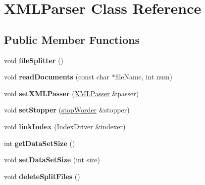 \hypertarget{class_x_m_l_parser}{\section{X\+M\+L\+Parser Class Reference}
\label{class_x_m_l_parser}
}
\subsection*{Public Member Functions}
\begin{DoxyCompactItemize}
\item 
\hypertarget{class_x_m_l_parser_a1e03b4c51d5514a5d380a29ce2b9ae02}{void {\bfseries file\+Splitter} ()}\label{class_x_m_l_parser_a1e03b4c51d5514a5d380a29ce2b9ae02}

\item 
\hypertarget{class_x_m_l_parser_ab523af367d976733643a693fa076e9f3}{void {\bfseries read\+Documents} (const char $\ast$file\+Name, int num)}\label{class_x_m_l_parser_ab523af367d976733643a693fa076e9f3}

\item 
\hypertarget{class_x_m_l_parser_a517be279016d30f9d0cdea2dcf4ccc10}{void {\bfseries set\+X\+M\+L\+Passer} (\hyperlink{class_x_m_l_passer}{X\+M\+L\+Passer} \&passer)}\label{class_x_m_l_parser_a517be279016d30f9d0cdea2dcf4ccc10}

\item 
\hypertarget{class_x_m_l_parser_ad05bc71918b6b83f11f7d273e3cbf8cc}{void {\bfseries set\+Stopper} (\hyperlink{classstop_worder}{stop\+Worder} \&stopper)}\label{class_x_m_l_parser_ad05bc71918b6b83f11f7d273e3cbf8cc}

\item 
\hypertarget{class_x_m_l_parser_a3aab029f49fac03c2a9ac8245301d3b5}{void {\bfseries link\+Index} (\hyperlink{class_index_driver}{Index\+Driver} \&indexer)}\label{class_x_m_l_parser_a3aab029f49fac03c2a9ac8245301d3b5}

\item 
\hypertarget{class_x_m_l_parser_aa0b86f09d7bdd7d336238f7fff9e2eec}{int {\bfseries get\+Data\+Set\+Size} ()}\label{class_x_m_l_parser_aa0b86f09d7bdd7d336238f7fff9e2eec}

\item 
\hypertarget{class_x_m_l_parser_ad0c0309ae4b155690bdf6224d3406510}{void {\bfseries set\+Data\+Set\+Size} (int size)}\label{class_x_m_l_parser_ad0c0309ae4b155690bdf6224d3406510}

\item 
\hypertarget{class_x_m_l_parser_a141c50da7263bcc3460ef970fd86dd7e}{void {\bfseries delete\+Split\+Files} ()}\label{class_x_m_l_parser_a141c50da7263bcc3460ef970fd86dd7e}


\end{DoxyCompactItemize}
